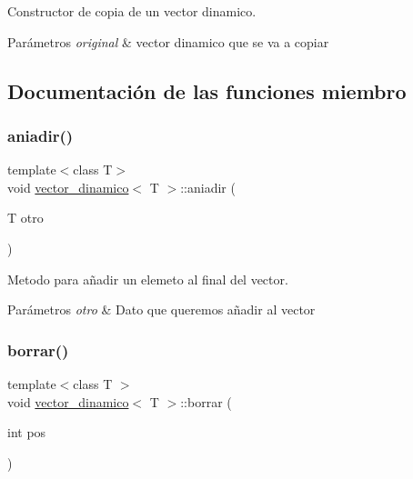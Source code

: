 Constructor de copia de un vector dinamico. 


\begin{DoxyParams}{Parámetros}
{\em original} & vector dinamico que se va a copiar \\
\hline
\end{DoxyParams}


\subsection{Documentación de las funciones miembro}
\mbox{\label{classvector__dinamico_ac1d374913e6a8b7cdcc45750e29213b0}} 
\subsubsection{\texorpdfstring{aniadir()}{aniadir()}}
{\footnotesize\ttfamily template$<$class T$>$ \\
void \hyperlink{classvector__dinamico}{vector\+\_\+dinamico}$<$ T $>$\+::aniadir (\begin{DoxyParamCaption}\item[{T}]{otro }\end{DoxyParamCaption})}



Metodo para añadir un elemeto al final del vector. 


\begin{DoxyParams}{Parámetros}
{\em otro} & Dato que queremos añadir al vector \\
\hline
\end{DoxyParams}
\mbox{\label{classvector__dinamico_a3d6c024fc32563bda3508264e12f9678}} 
\subsubsection{\texorpdfstring{borrar()}{borrar()}}
{\footnotesize\ttfamily template$<$class T $>$ \\
void \hyperlink{classvector__dinamico}{vector\+\_\+dinamico}$<$ T $>$\+::borrar (\begin{DoxyParamCaption}\item[{int}]{pos }\end{DoxyParamCaption})}



